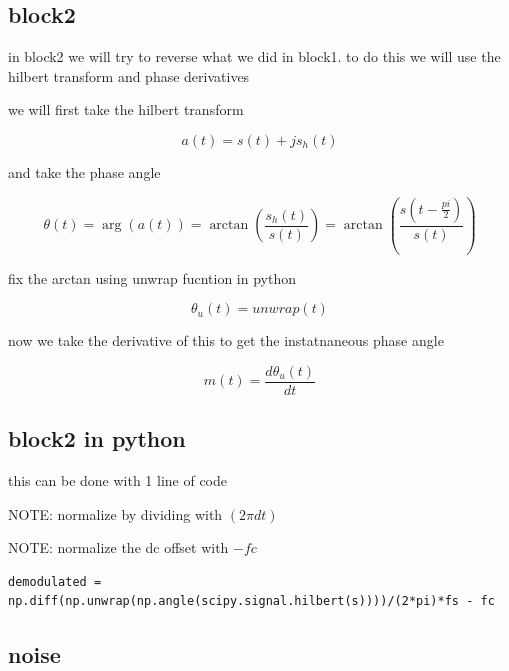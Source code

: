 \documentclass[conference]{IEEEtran}
\begin{document}


\subsection{block2}

in block2 we will try to reverse what we did in block1. to do this we will use the hilbert transform and phase derivatives


we will first take the hilbert transform

\begin{equation}
    a(t) = s(t) + js_h(t)
\end{equation}


and take the phase angle

\begin{equation}
    \theta(t) = \arg(a(t)) = \arctan(\frac{s_h(t)}{s(t)})
    = \arctan(\frac{s(t - \frac{pi}{2})}{s(t)})
\end{equation}


fix the arctan using unwrap fucntion in python

\begin{equation}
    \theta_u(t) = unwrap(t)
\end{equation}




now we take the derivative of this to get the instatnaneous phase angle

\begin{equation}
    m(t) = \frac{d\theta_u(t)}{dt}
\end{equation}




\subsection{block2 in python}

this can be done with 1 line of code

NOTE: normalize by dividing with $(2\pi dt)$

NOTE: normalize the dc offset with $-fc$

\begin{lstlisting}
demodulated = np.diff(np.unwrap(np.angle(scipy.signal.hilbert(s))))/(2*pi)*fs - fc
\end{lstlisting}



\subsection{noise}
\end{document}
